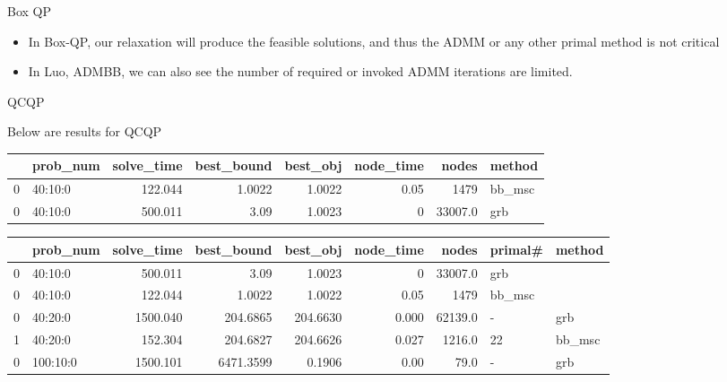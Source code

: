 \documentclass[aspectratio=1610, 9pt]{beamer}
\begin{document}
\begin{frame}[standout]{Box QP}
\begin{table}[h!]
    \begin{itemize}
      \item In Box-QP, our relaxation will produce the feasible solutions, and thus the ADMM or any other primal method is not critical
      \item In \textsf{Luo, ADMBB}, we can also see the number of required or invoked ADMM iterations are limited.
    \end{itemize}
  \end{table}
  \normalsize

\end{frame}

\begin{frame}[standout]{QCQP}

  Below are results for QCQP

  \small
  \begin{table}[h!]
    \begin{tabular}{llrrrrrl}
      \toprule
      {} & prob\_num & solve\_time & best\_bound & best\_obj & node\_time & nodes   & method  \\
      \midrule
      0  & 40:10:0   & 122.044     & 1.0022      & 1.0022    & 0.05       & 1479    & bb\_msc \\
      0  & 40:10:0   & 500.011     & 3.09        & 1.0023    & 0          & 33007.0 & grb     \\
      \bottomrule
    \end{tabular}
  \end{table}
  \begin{table}[h!]
    \centering
    \begin{tabular}{llrrrrrll}
      \toprule
      {} & prob\_num & solve\_time & best\_bound & best\_obj & node\_time & nodes   & primal\# & method  \\
      \midrule
      0  & 40:10:0   & 500.011     & 3.09        & 1.0023    & 0          & 33007.0 & grb                \\
      0  & 40:10:0   & 122.044     & 1.0022      & 1.0022    & 0.05       & 1479    & bb\_msc            \\
      0  & 40:20:0   & 1500.040    & 204.6865    & 204.6630  & 0.000      & 62139.0 & -        & grb     \\
      1  & 40:20:0   & 152.304     & 204.6827    & 204.6626  & 0.027      & 1216.0  & 22       & bb\_msc \\
      0  & 100:10:0  & 1500.101    & 6471.3599   & 0.1906    & 0.00       & 79.0    & -        & grb     \\

\end{tabular}
\end{table}
\end{frame}
\end{document}
